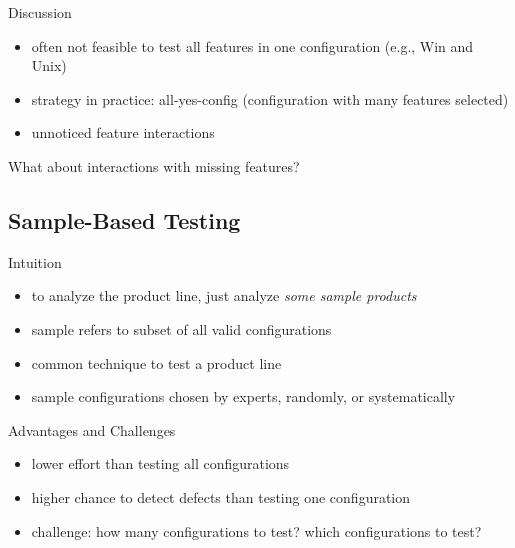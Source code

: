 \begin{frame}[b]{\myframetitle}
\begin{mycolumns}[b]
\begin{note}{Discussion}
\begin{itemize}
				\item often not feasible to test all features in one configuration (e.g., Win and Unix)
				\item strategy in practice: all-yes-config (configuration with many features selected)
				\item unnoticed feature interactions\mysource{\lectureinteractions}
			\end{itemize}
		\end{note}
		\pause
		\begin{example}{What about interactions with missing features?}
			\centering{}
		\end{example}
	\end{mycolumns}
\end{frame}

\subsection{Sample-Based Testing}
\begin{frame}{\myframetitle}
	\begin{mycolumns}
		\begin{definition}{Intuition}
			\begin{itemize}
				\item to analyze the product line, just analyze \emph{some sample products}
				\item sample  refers to subset of all valid configurations
				\item common technique to test a product line
				\item sample configurations chosen by experts, randomly, or systematically
			\end{itemize}
		\end{definition}
		\pause
		\begin{note}{Advantages and Challenges}
			\begin{itemize}
				\item lower effort than testing all configurations
				\item higher chance to detect defects than testing one configuration
				\item challenge: how many configurations to test? which configurations to test?
			\end{itemize}
		\end{note}
	\mynextcolumn
		\pause
	\end{mycolumns}
\end{frame}

